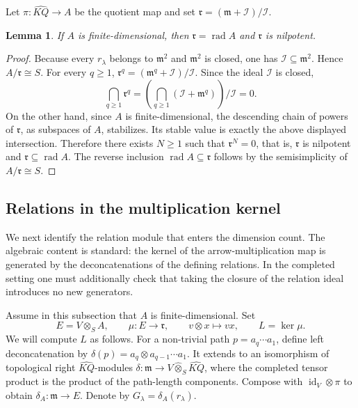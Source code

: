 \documentclass[11pt,letterpaper,reqno]{amsart}
\newtheorem{lemma}[lemma]{Lemma}
\theoremstyle{definition}
\DeclareMathOperator{\rad}{rad}
\newcommand{\m}{\mathfrak m}
\newcommand{\rA}{\mathfrak r}
\newcommand{\widehatKQ}{\widehat{KQ}}
\begin{document}
	Let $\pi:\widehatKQ\to A$ be the quotient map and set $\rA=(\m+\mathcal I)/\mathcal I$.
	
	\begin{lemma}
		\label{lemma:radical}
		If $A$ is finite-dimensional, then $\rA=\rad A$ and $\rA$ is nilpotent.
	\end{lemma}
	
	\begin{proof}
		Because every $r_\lambda$ belongs to $\m^2$ and $\m^2$ is closed, one has
		$\mathcal I\subseteq\m^2$.  Hence $A/\rA\cong S$.  For every $q\geq1$, $\rA^q=(\m^q+\mathcal I)/\mathcal I$. Since the ideal $\mathcal I$ is closed, 
		\[
		\bigcap_{q\geq1}\rA^q
		=\left(\bigcap_{q\geq1}(\mathcal I+\m^q)\right)/\mathcal I
		=0.
		\]
		On the other hand, since $A$ is finite-dimensional, the descending chain of powers of $\rA$, as subspaces of $A$, stabilizes.  Its stable value is exactly the above displayed intersection. Therefore there exists $N\geq 1$ such that $\rA^N=0$, that is,
		$\rA$ is nilpotent and $\rA\subseteq\rad A$. The reverse inclusion $\rad A\subseteq\rA$ follows by the semisimplicity of
		$A/\rA\cong S$.
	\end{proof}
	
	\subsection{Relations in the multiplication kernel}
	
	We next identify the relation module that enters the dimension count.  The
	algebraic content is standard: the kernel of the arrow-multiplication map is
	generated by the deconcatenations of the defining relations.  In the
	completed setting one must additionally check that taking the closure of the
	relation ideal introduces no new generators.
	
	Assume in this subsection that $A$ is finite-dimensional.  Set
	\[
	E=V\otimes_SA,
	\qquad
	\mu:E\longrightarrow\rA,
	\qquad
	v\otimes x\longmapsto vx,
	\qquad
	L=\ker\mu.
	\]
	We will compute $L$ as follows.
	For a non-trivial path $p=a_q\cdots a_1$, define left deconcatenation by $\delta(p)=a_q\otimes a_{q-1}\cdots a_1$. It extends to an isomorphism of topological right $\widehatKQ$-modules $\delta:\m\longrightarrow V\widehat\otimes_S\widehatKQ$, where the completed tensor product is the product of the path-length components.  Compose with $\operatorname{id}_V\otimes\pi$ to obtain $\delta_A:\m\longrightarrow E$. Denote by $G_\lambda=\delta_A(r_\lambda)$.
	
\end{document}
